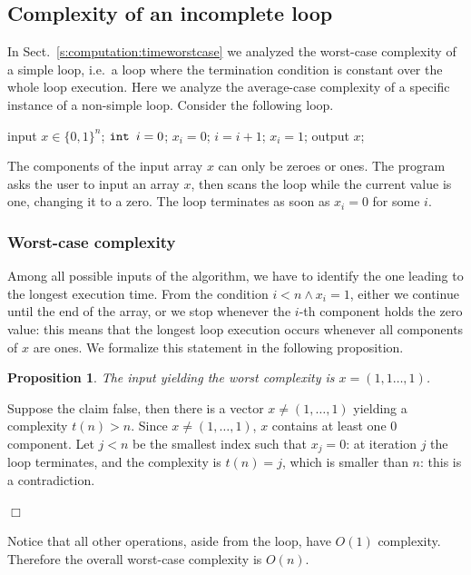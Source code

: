 \documentclass[a4paper]{book}
\theoremstyle{changebreak}                %
\newtheorem{prop}[result]{Proposition}
\newenvironment{proof}
 {{\sl Proof.}\hspace*{1 ex}}%
 {{\nopagebreak\hspace*{\fill}$\Box$\par\vspace{12pt}}}
\begin{document}
\subsection{Complexity of an incomplete loop}
\label{s:linear:array:incomplete}
In Sect.~\ref{s:computation:timeworstcase} we analyzed the worst-case
complexity of a simple loop, i.e.~a loop where the
termination condition is constant over the whole loop execution. Here
we analyze the average-case complexity
of a specific instance of a non-simple loop. Consider the
following loop.
\begin{algorithmic}[1]
\STATE input $x\in\{0,1\}^n$; \label{step:input}
\STATE $\mbox{\tt int }i=0$;
  \STATE $x_i=0$;
  \STATE $i=i+1$;
\ENDWHILE
{}
  \STATE $x_i=1$;
\ENDIF
\STATE output $x$;
\end{algorithmic}
The components of the input array $x$ can only be zeroes or ones. The
program asks the user to input an array $x$, then scans the loop while
the current value is one, changing it to a zero. The loop
terminates as soon as $x_i=0$ for some $i$.

\subsubsection{Worst-case complexity}
Among all possible inputs of the algorithm, we
have to identify the one leading to the longest execution time. From
the condition $i<n\land x_i=1$, either we continue until the end of
the array, or we stop whenever the $i$-th component holds the zero
value: this means that the longest loop execution occurs whenever all
components of $x$ are ones. We formalize this statement in the
following proposition.
\begin{prop}
The input yielding the worst complexity is $x=(1,1\ldots,1)$.
\end{prop}
\begin{proof}
Suppose the claim false, then there is a vector $x\not=(1,\ldots,1)$
yielding a complexity $t(n)>n$. Since $x\not=(1,\ldots,1)$, $x$
contains at least one 0 component. Let $j<n$ be the smallest index
such that $x_j=0$: at iteration $j$ the loop terminates, and the
complexity is $t(n)=j$, which is smaller than $n$: this is a
contradiction.
\end{proof}
Notice that all other operations, aside from the loop, have $O(1)$
complexity. Therefore the overall worst-case
complexity is $O(n)$.
\end{document}
